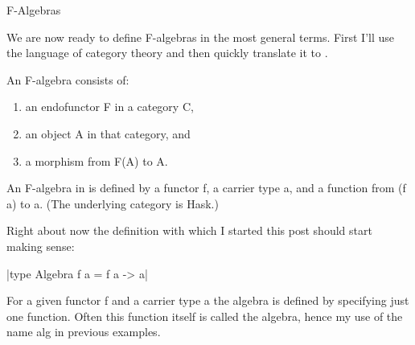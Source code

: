 \documentclass[proposal.tex]{subfiles}
\begin{document}
F-Algebras


We are now ready to define F-algebras in the most general terms. First I'll use the language of category theory and then quickly translate 
it to .

An F-algebra consists of:
\begin{enumerate}
\item an endofunctor F in a category C,
\item an object A in that category, and
\item a morphism from F(A) to A.
\end{enumerate}
    
An F-algebra in  is defined by a functor f, a carrier type a, and a function from (f a) to a. (The underlying category is Hask.)

Right about now the definition with which I started this post should start making sense:

|type Algebra f a = f a -> a|

For a given functor f and a carrier type a the algebra is defined by specifying just one function. Often this function itself is called the 
algebra, hence my use of the name alg in previous examples.
\end{document}
